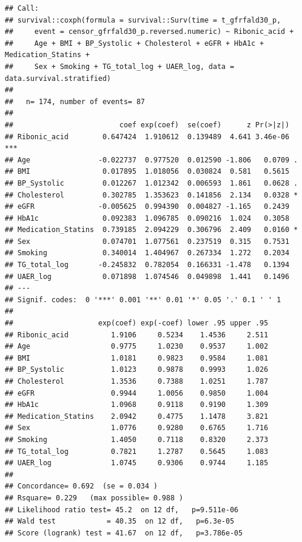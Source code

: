 \documentclass[]{article}
\begin{document}
\begin{verbatim}
## Call:
## survival::coxph(formula = survival::Surv(time = t_gfrfald30_p, 
##     event = censor_gfrfald30_p.reversed.numeric) ~ Ribonic_acid + 
##     Age + BMI + BP_Systolic + Cholesterol + eGFR + HbA1c + Medication_Statins + 
##     Sex + Smoking + TG_total_log + UAER_log, data = data.survival.stratified)
## 
##   n= 174, number of events= 87 
## 
##                         coef exp(coef)  se(coef)      z Pr(>|z|)    
## Ribonic_acid        0.647424  1.910612  0.139489  4.641 3.46e-06 ***
## Age                -0.022737  0.977520  0.012590 -1.806   0.0709 .  
## BMI                 0.017895  1.018056  0.030824  0.581   0.5615    
## BP_Systolic         0.012267  1.012342  0.006593  1.861   0.0628 .  
## Cholesterol         0.302785  1.353623  0.141856  2.134   0.0328 *  
## eGFR               -0.005625  0.994390  0.004827 -1.165   0.2439    
## HbA1c               0.092383  1.096785  0.090216  1.024   0.3058    
## Medication_Statins  0.739185  2.094229  0.306796  2.409   0.0160 *  
## Sex                 0.074701  1.077561  0.237519  0.315   0.7531    
## Smoking             0.340014  1.404967  0.267334  1.272   0.2034    
## TG_total_log       -0.245832  0.782054  0.166331 -1.478   0.1394    
## UAER_log            0.071898  1.074546  0.049898  1.441   0.1496    
## ---
## Signif. codes:  0 '***' 0.001 '**' 0.01 '*' 0.05 '.' 0.1 ' ' 1
## 
##                    exp(coef) exp(-coef) lower .95 upper .95
## Ribonic_acid          1.9106     0.5234    1.4536     2.511
## Age                   0.9775     1.0230    0.9537     1.002
## BMI                   1.0181     0.9823    0.9584     1.081
## BP_Systolic           1.0123     0.9878    0.9993     1.026
## Cholesterol           1.3536     0.7388    1.0251     1.787
## eGFR                  0.9944     1.0056    0.9850     1.004
## HbA1c                 1.0968     0.9118    0.9190     1.309
## Medication_Statins    2.0942     0.4775    1.1478     3.821
## Sex                   1.0776     0.9280    0.6765     1.716
## Smoking               1.4050     0.7118    0.8320     2.373
## TG_total_log          0.7821     1.2787    0.5645     1.083
## UAER_log              1.0745     0.9306    0.9744     1.185
## 
## Concordance= 0.692  (se = 0.034 )
## Rsquare= 0.229   (max possible= 0.988 )
## Likelihood ratio test= 45.2  on 12 df,   p=9.511e-06
## Wald test            = 40.35  on 12 df,   p=6.3e-05
## Score (logrank) test = 41.67  on 12 df,   p=3.786e-05
\end{verbatim}

\newpage
\end{document}
